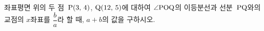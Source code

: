 좌표평면 위의 두 점~$\mathrm{P}(3,\mkern3mu 4)$, $\mathrm{Q}(12,\mkern3mu 5)$에 대하여 $\angle\mathrm{POQ}$의 이등분선과 선분~$\mathrm{PQ}$와의 교점의 $x$좌표를 $\dfrac{b}{a}$라 할 때, $a+b$의 값을 구하시오. 
